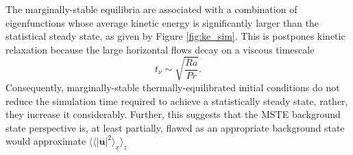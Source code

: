 \documentclass[reprint,amsmath,amssymb,aps]{revtex4-1}
\begin{document}
The marginally-stable equilibria are associated with a combination of eigenfunctions whose average kinetic energy is significantly larger than the statistical steady state, as given by Figure \ref{fig:ke_sim}. 
This is postpones kinetic relaxation because the large horizontal flows decay on a viscous timescale
\begin{equation}
    t_{\nu} \sim \sqrt{\frac{Ra}{Pr}}. \nonumber
\end{equation}
Consequently, marginally-stable thermally-equilibrated initial conditions do not reduce the simulation time required to achieve a statistically steady state, rather, they increase it considerably. Further, this suggests that the MSTE background state perspective is, at least partially, flawed as an appropriate background state would approximate $\langle \langle |\mathbf{u}|^2 \rangle_x \rangle_z$
\end{document}
